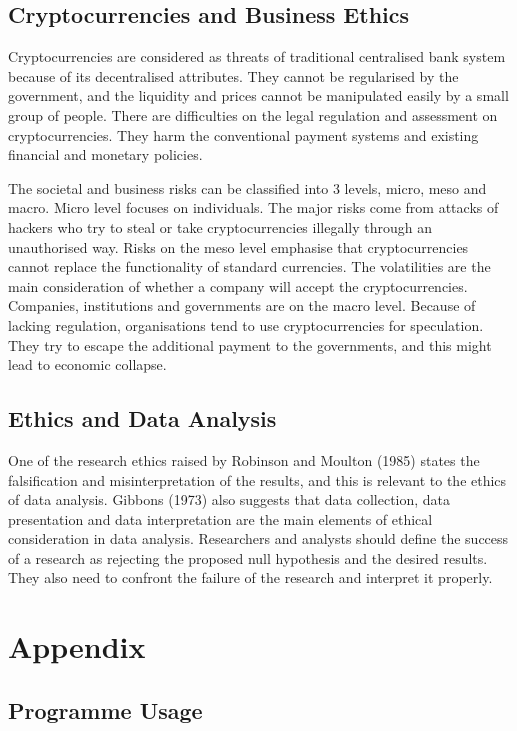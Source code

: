 \documentclass[11pt]{article} %
\theoremstyle{plain}
\theoremstyle{definition}
\begin{document}
\subsection{Cryptocurrencies and Business Ethics}

Cryptocurrencies are considered as threats of traditional centralised bank system because of its decentralised attributes. They cannot be regularised by the government, and the liquidity and prices cannot be manipulated easily by a small group of people. There are difficulties on the legal regulation and assessment on cryptocurrencies. They harm the conventional payment systems and existing financial and monetary policies.

The societal and business risks can be classified into 3 levels, micro, meso and macro. Micro level focuses on individuals. The major risks come from attacks of hackers who try to steal or take cryptocurrencies illegally through an unauthorised way. Risks on the meso level emphasise that cryptocurrencies cannot replace the functionality of standard currencies. The volatilities are the main consideration of whether a company will accept the cryptocurrencies. Companies, institutions and governments are on the macro level. Because of lacking regulation, organisations tend to use cryptocurrencies for speculation. They try to escape the additional payment to the governments, and this might lead to economic collapse\cite{Dierksmeier2016}.

\subsection{Ethics and Data Analysis}

One of the research ethics raised by Robinson and Moulton (1985) states the falsification and misinterpretation of the results, and this is relevant to the ethics of data analysis. Gibbons (1973) also suggests that data collection, data presentation and data interpretation are the main elements of ethical consideration in data analysis. Researchers and analysts should define the success of a research as rejecting the proposed null hypothesis and the desired results. They also need to confront the failure of the research and interpret it properly\cite{10.2307/1177102}.

\section{Appendix}
\subsection{Programme Usage}
\end{document}
